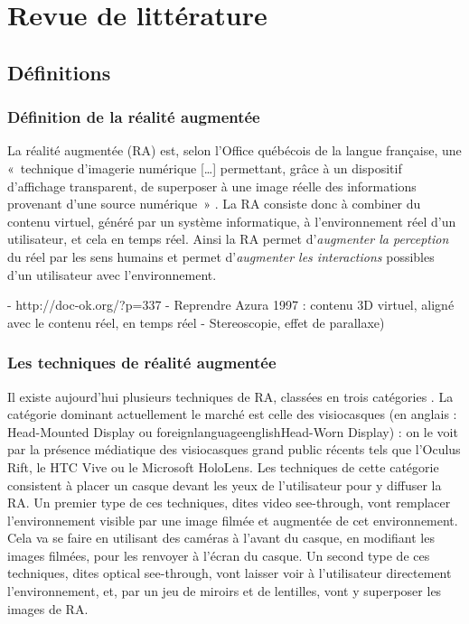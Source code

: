 \chapter{Revue de littérature}
\label{ch:litterature}

\section{Définitions}
\subsection{Définition de la réalité augmentée}
La réalité augmentée (RA) est, selon l'Office québécois de la langue française, une «~technique d'imagerie numérique […] permettant, grâce à un dispositif d'affichage transparent, de superposer à une image réelle des informations provenant d'une source numérique~» \citep{OfficeQuebecoisLangueFrancaiseRA2015}. La RA consiste donc à combiner du contenu virtuel, généré par un système informatique, à l'environnement réel d'un utilisateur, et cela en temps réel. Ainsi la RA permet d'\emph{augmenter la perception} du réel par les sens humains et permet d'\emph{augmenter les interactions} possibles d'un utilisateur avec l'environnement. \citep{Azuma1997}

- http://doc-ok.org/?p=337
    - Reprendre Azura 1997 : contenu 3D virtuel, aligné avec le contenu réel, en temps réel
    - Stereoscopie, effet de parallaxe)

\subsection{Les techniques de réalité augmentée}

Il existe aujourd'hui plusieurs techniques de RA, classées en trois catégories . La catégorie dominant actuellement le marché est celle des visiocasques (en anglais : \foreignlanguage{english}{Head-Mounted Display} ou foreignlanguage{english}{Head-Worn Display}) \citep{VanKrevelenPoelman2010} : on le voit par la présence médiatique des visiocasques grand public récents tels que l'Oculus Rift, le HTC Vive ou le Microsoft HoloLens. Les techniques de cette catégorie consistent à placer un casque devant les yeux de l'utilisateur pour y diffuser la RA. Un premier type de ces techniques, dites \foreignlanguage{english}{video see-through}, vont remplacer l'environnement visible par une image filmée et augmentée de cet environnement. Cela va se faire en utilisant des caméras à l'avant du casque, en modifiant les images filmées, pour les renvoyer à l'écran du casque. Un second type de ces techniques, dites \foreignlanguage{english}{optical see-through}, vont laisser voir à l'utilisateur directement l'environnement, et, par un jeu de miroirs et de lentilles, vont y superposer les images de RA.


